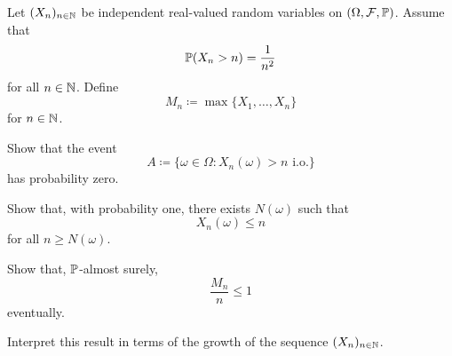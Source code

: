 \begin{exercise} %
Let $(X_n)_{n \in \mathbb{N}}$ be independent real-valued random variables on $(\Omega,\mathcal{F},\mathbb{P})$.
Assume that
\[
\mathbb{P}(X_n > n) = \frac{1}{n^2}
\]
for all $n \in \mathbb{N}$.
Define
\[
M_n \coloneq \max\{X_1,\dots,X_n\}
\]
for $n \in \mathbb{N}$.
\begin{enumerate}[label={\protect\hyperref[solitem:borel-cantelli-maxima:\arabic*]{(\alph*)}}]
\item \label{exitem:borel-cantelli-maxima:1}
Show that the event
\[
A
\coloneq
\{\omega \in \Omega : X_n(\omega)>n \text{ i.o.}\}
\]
has probability zero.
\item \label{exitem:borel-cantelli-maxima:2}
Show that, with probability one, there exists $N(\omega)$ such that 
\[
X_n(\omega) \le n
\]
for all $n \ge N(\omega)$.
\item \label{exitem:borel-cantelli-maxima:3}
Show that, $\mathbb{P}$-almost surely,
\[
\frac{M_n}{n} \le 1
\]
eventually.
\item \label{exitem:borel-cantelli-maxima:4}
Interpret this result in terms of the growth of the sequence $(X_n)_{n \in \mathbb{N}}$.
\qedhere
\end{enumerate}
\end{exercise}

